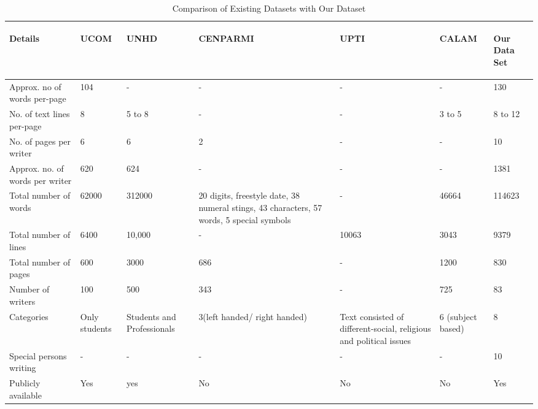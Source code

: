 \documentclass[a4paper,conference]{IEEEtran}
\begin{document}
\begin{table}[t]
\centering
\caption{Comparison of Existing Datasets with Our Dataset}\label{tabdataset}
\begin{tabular}{|p{1.2cm}|p{0.6cm}|p{0.6cm}|p{1.5cm}|p{0.5cm}|p{0.7cm}|p{0.5cm}|}
\hline
\begin{flushleft}
\textbf{Details	}
\end{flushleft}& \begin{flushleft}
\textbf{UCOM}
\end{flushleft} & \begin{flushleft}
\textbf{UNHD}
\end{flushleft} & \begin{flushleft}
\textbf{CENPARMI}
\end{flushleft} & \begin{flushleft}
\textbf{UPTI}	
\end{flushleft}& \begin{flushleft}
\textbf{CALAM}
\end{flushleft} &	\begin{flushleft}
\textbf{Our Data Set}
\end{flushleft} \\ \hline
Approx. no of words per-page &	104	& - & - & - &	-&	130 \\ \hline
No. of text lines per-page	& 8	& 5 to 8 & - & - &	3 to 5	& 8 to 12 \\ \hline
No. of pages per writer	&6&	6&	2& - & -&			10 \\ \hline
Approx. no. of words per writer &	620	& 624& -&-&-&				1381 \\ \hline
Total number of words	& 62000	&312000	&20 digits, freestyle date, 38 numeral stings, 43 characters, 57 words, 5 special symbols		& -& 46664	& 114623 \\ \hline
Total number of lines &	6400 &	10,000&-&		10063	&3043&	9379 \\ \hline

Total number of pages&	600	&3000&	686	&-&	1200&	830 \\ \hline

Number of writers	& 100&	500	&343&-&		725&	83 \\ \hline

Categories&	Only students&	Students and Professionals &	3(left handed/ right handed)&	Text consisted of different-social, religious and political issues	&6 (subject based)&	8 \\ \hline
Special persons writing	& - & - & - & - & - &			10 \\ \hline

Publicly available	& Yes	&yes&	No&	No&	No&	Yes \\ \hline


\hline
 \end{tabular}
\end{table}
\end{document}
